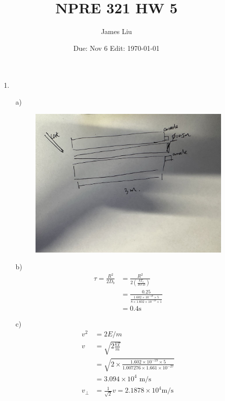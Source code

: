 \documentclass{article}
\date{Due: Nov 6 Edit: \today}
\title{NPRE 321 HW 5}
\author{James Liu}
\begin{document}
\maketitle
\begin{itemize}
    \item [1.] \
    \begin{itemize}
        \item [a)] \
        \begin{figure}[h]
            \centering
            \includegraphics[scale=0.25]{figure/fig1_npre321_hw5_.jpeg}
        \end{figure}
        \item [b)] \
        \begin{align*}
            \tau =\frac{R^2}{2D_b}&=\frac{R^2}{2\left(\frac{kT_e}{16eB}\right)}\\
            &=\frac{0.25}{\frac{1.602\times 10^{-19}\times 5}{8\times 1.602\times 10^{-19}\times1}}\\
            &=0.4 \text{s}
        \end{align*}
        \item [c)] \
        \begin{align*}
            v^2 &=2E/m\\
            v&=\sqrt{2\frac{kT}{m}}\\
            &=\sqrt{2\times \frac{1.602\times 10^{-19}\times 5}{1.007276\times 1.661\times 10^{-27}}}\\
            &= 3.094\times 10^4 \text{ m/s}\\
            v_{\bot }&=\frac{1}{\sqrt2}v = 2.1878\times 10^{4} \text{m/s}\\

\end{align*}
\end{itemize}
\end{itemize}
\end{document}
